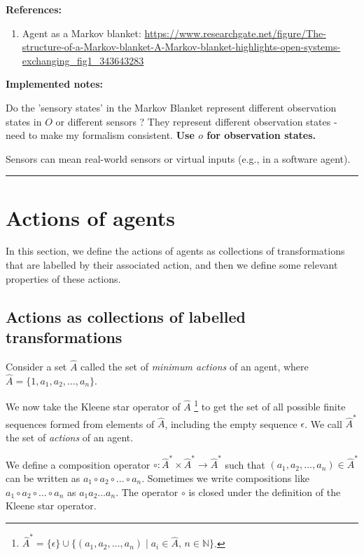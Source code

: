 {\begin{compactitem}
		\item \textbf{References:}
		\begin{enumerate}
			\item Agent as a Markov blanket: \url{https://www.researchgate.net/figure/The-structure-of-a-Markov-blanket-A-Markov-blanket-highlights-open-systems-exchanging_fig1_343643283}
		\end{enumerate}
	\end{compactitem}


	\textbf{Implemented notes:}
	\begin{compactitem}
		\item Do the 'sensory states' in the Markov Blanket represent different observation states in $O$ or different sensors ? They represent different observation states - need to make my formalism consistent. \textbf{Use $o$ for observation states.}
		\item Sensors can mean real-world sensors or virtual inputs (e.g., in a software agent).
	\end{compactitem}
	\noindent\rule{\textwidth}{1mm}
}

\section{Actions of agents}

In this section, we define the actions of agents as collections of transformations that are labelled by their associated action, and then we define some relevant properties of these actions.

\subsection{Actions as collections of labelled transformations}

Consider a set $\hat{A}$ called the set of \emph{minimum actions} of an agent, where $\hat{A} = \{1, a_{1}, a_{2}, \dots, a_{n}\}$.

We now take the Kleene star operator of $\hat{A}$ \footnote{
	$\hat{A}^{\ast} = \{ \epsilon \} \cup \{ (a_1, a_2, \dots, a_n) \mid a_i \in \hat{A}, \, n \in \mathbb{N} \}$.
} to get the set of all possible finite sequences formed from elements of $\hat{A}$, including the empty sequence $\epsilon$.
We call $\hat{A}^{\ast}$ the set of \emph{actions} of an agent.

We define a composition operator $\circ: \hat{A}^{\ast} \times \hat{A}^{\ast} \to \hat{A}^{\ast}$ such that $(a_1, a_2, \dots, a_n) \in \hat{A}^{\ast}$ can be written as $a_1 \circ a_2 \circ \dots \circ a_n$.
Sometimes we write compositions like $a_1 \circ a_2 \circ \dots \circ a_n$ as $a_1 a_2 \dots a_n$.
The operator $\circ$ is closed under the definition of the Kleene star operator.

